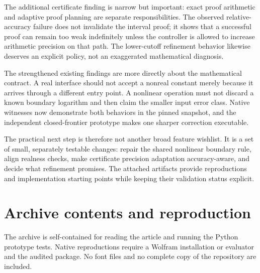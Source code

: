 \documentclass[11pt,letterpaper]{article}
\begin{document}
The additional certificate finding is narrow but important: exact proof arithmetic and adaptive proof planning are separate responsibilities. The observed relative-accuracy failure does not invalidate the interval proof; it shows that a successful proof can remain too weak indefinitely unless the controller is allowed to increase arithmetic precision on that path. The lower-cutoff refinement behavior likewise deserves an explicit policy, not an exaggerated mathematical diagnosis.

The strengthened existing findings are more directly about the mathematical contract. A real interface should not accept a nonreal constant merely because it arrives through a different entry point. A nonlinear operation must not discard a known boundary logarithm and then claim the smaller input error class. Native witnesses now demonstrate both behaviors in the pinned snapshot, and the independent closed-frontier prototype makes one sharper correction executable.

The practical next step is therefore not another broad feature wishlist. It is a set of small, separately testable changes: repair the shared nonlinear boundary rule, align realness checks, make certificate precision adaptation accuracy-aware, and decide what refinement promises. The attached artifacts provide reproductions and implementation starting points while keeping their validation status explicit.

\appendix
\section{Archive contents and reproduction}
\label{sec:archive}
The archive is self-contained for reading the article and running the Python prototype tests. Native reproductions require a Wolfram installation or evaluator and the audited package. No font files and no complete copy of the repository are included.
\end{document}
